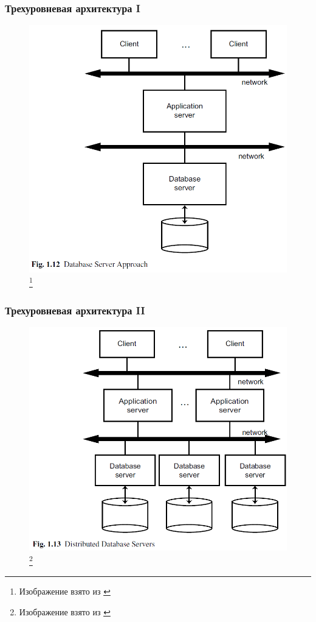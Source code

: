 \documentclass{beamer}
\begin{document}
\begin{frame}
\frametitle{Трехуровневая архитектура I}

\begin{figure}[htb]
	\includegraphics[width=\textwidth,height=0.80\textheight,keepaspectratio]{ozsu-8.png} 
	\footnote{\tiny{Изображение взято из \cite{Ozsu2011}}}
\end{figure}

\end{frame}

\begin{frame}
\frametitle{Трехуровневая архитектура II}

\begin{figure}[htb]
	\includegraphics[width=\textwidth,height=0.80\textheight,keepaspectratio]{ozsu-9.png} 
	\footnote{\tiny{Изображение взято из \cite{Ozsu2011}}}
\end{figure}

\end{frame}
\end{document}

